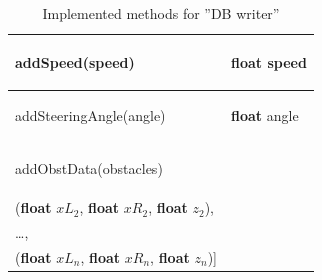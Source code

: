 \documentclass[]{scrreprt}
\begin{document}
\begin{table}[H]
\begin{tabular}{|l|l|}
\begin{pbox}{6.0cm}{\vspace{.2\baselineskip}
					addSpeed(speed)	
					\vspace{.3\baselineskip}}
			\end{pbox}&
			\begin{pbox}{6.0cm}{\vspace{.2\baselineskip}
					\textbf{float} speed
					\vspace{.3\baselineskip}}
			\end{pbox}\\ 
			\hline 
			\begin{pbox}{6.0cm}{\vspace{.2\baselineskip}
					addSteeringAngle(angle)	
					\vspace{.3\baselineskip}} 
			\end{pbox}&
			\begin{pbox}{6.0cm}{\vspace{.2\baselineskip}
					\textbf{float} angle
					\vspace{.3\baselineskip}}
			\end{pbox}\\ 
			\hline 
			\begin{pbox}{6.0cm}{\vspace{.2\baselineskip}
					addObstData(obstacles)
					\vspace{.3\baselineskip}} 
			\end{pbox}&
			\begin{pbox}{6.0cm}{\vspace{.2\baselineskip}
					[(\textbf{float} $xL_1$, \textbf{float} $xR_1$, \textbf{float} $z_1$),\\ (\textbf{float} $xL_2$, \textbf{float} $xR_2$, \textbf{float} $z_2$),\\  \dots, \\(\textbf{float} $xL_n$, \textbf{float} $xR_n$, \textbf{float} $z_n$)]
					\vspace{.3\baselineskip}}
			\end{pbox}\\ 
			\hline  
		\end{tabular} 
	\caption{Implemented methods for ''DB writer''} \label{tab:dbWriter}
		
	\end{table}
	
\end{document}
